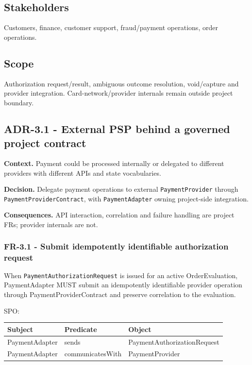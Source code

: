 \documentclass[
  10pt,
]{article}
\begin{document}
\subsection{Stakeholders}\label{stakeholders-2}

Customers, finance, customer support, fraud/payment operations, order
operations.

\subsection{Scope}\label{scope-2}

Authorization request/result, ambiguous outcome resolution, void/capture
and provider integration. Card-network/provider internals remain outside
project boundary.

\subsection{ADR-3.1 - External PSP behind a governed project
contract}\label{adr-31---external-psp-behind-a-governed-project-contract}

\textbf{Context.} Payment could be processed internally or delegated to
different providers with different APIs and state vocabularies.

\textbf{Decision.} Delegate payment operations to external
\texttt{PaymentProvider} through \texttt{PaymentProviderContract}, with
\texttt{PaymentAdapter} owning project-side integration.

\textbf{Consequences.} API interaction, correlation and failure handling
are project FRs; provider internals are not.

\subsubsection{FR-3.1 - Submit idempotently identifiable authorization
request}\label{fr-31---submit-idempotently-identifiable-authorization-request}

When \texttt{PaymentAuthorizationRequest} is issued for an active
OrderEvaluation, PaymentAdapter MUST submit an idempotently identifiable
provider operation through PaymentProviderContract and preserve
correlation to the evaluation.

SPO:

\begin{longtable}[]{@{}lll@{}}
\toprule\noalign{}
Subject & Predicate & Object \\
\midrule\noalign{}
\endhead
\bottomrule\noalign{}
\endlastfoot
PaymentAdapter & sends & PaymentAuthorizationRequest \\
PaymentAdapter & communicatesWith & PaymentProvider \\
\end{longtable}
\end{document}
